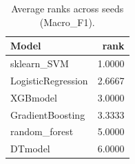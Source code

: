 \begin{table}[t]
\centering
\begin{tabular}{lr}
\toprule
Model & rank \\
\midrule
sklearn_SVM & 1.0000 \\
LogisticRegression & 2.6667 \\
XGBmodel & 3.0000 \\
GradientBoosting & 3.3333 \\
random_forest & 5.0000 \\
DTmodel & 6.0000 \\
\bottomrule
\end{tabular}
\caption{Average ranks across seeds (Macro_F1).}
\label{tab:avg_rank_Macro_F1}
\end{table}